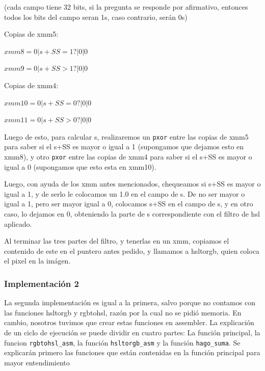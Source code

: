 \documentclass[a4paper]{article}
\begin{document}
\vspace*{0.3cm}

(cada campo tiene 32 bits, si la pregunta se responde por afirmativo, entonces todos los bits del campo seran 1s, caso contrario, serán 0s)

\vspace*{0.3cm}

Copias de xmm5:

\vspace*{0.3cm}

$xmm8= 0 | s+SS = 1?| 0 | 0$

\vspace*{0.3cm} 

$xmm9=0 |s+SS > 1?| 0 | 0$

\vspace*{0.3cm}

Copias de xmm4:

\vspace*{0.3cm}

$xmm10= 0 |s+SS= 0?| 0 | 0$

\vspace*{0.3cm}

$xmm11= 0 |s+SS > 0?| 0 | 0$

\vspace*{0.3cm}

Luego de esto, para calcular s, realizaremos un {\tt pxor} entre las copias de xmm5 para saber si el s+SS es mayor o igual a 1 (supongamos que dejamos esto en xmm8), y otro {\tt pxor} entre las copias de xmm4 para saber si el s+SS es mayor o igual a 0 (supongamos que esto esta en xmm10).

Luego, con ayuda de los xmm antes mencionados, chequeamos si s+SS es mayor o igual a 1, y de serlo le colocamos un 1.0 en el campo de s. De no ser mayor o igual a 1, pero ser mayor igual a 0, colocamos s+SS en el campo de s, y en otro caso, lo dejamos en 0, obteniendo la parte de s correspondiente con el filtro de hsl aplicado. 

Al terminar las tres partes del filtro, y tenerlas en un xmm, copiamos el contenido de este en el puntero antes pedido, y llamamos a hsltorgb, quien coloca el pixel en la imágen.

\subsubsection{Implementación 2}
La segunda implementación es igual a la primera, salvo porque no contamos con las funciones hsltorgb y rgbtohsl, razón por la cual no se pidió memoria. En cambio, nosotros tuvimos que crear estas funciones en assembler. La explicación de un ciclo de ejecución se puede dividir en cuatro partes: La función principal, la funcion {\tt rgbtohsl\_asm}, la función {\tt hsltorgb\_asm} y la función {\tt hago\_suma}. Se explicarán primero las funciones que están contenidas en la función principal para mayor entendimiento
\end{document}

